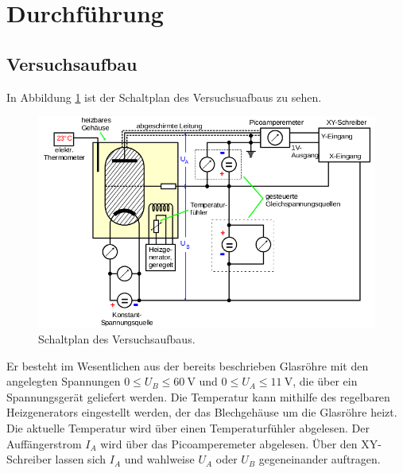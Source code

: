 \section{Durchführung}
\subsection{Versuchsaufbau}
In Abbildung \ref{fig:4} ist der Schaltplan des Versuchsuafbaus zu sehen.
\begin{figure}
  \centering
  \includegraphics[scale=0.5]{aufbau.png}
  \caption{Schaltplan des Versuchsaufbaus. \cite{anleitung}}
  \label{fig:4}
\end{figure}
Er besteht im Wesentlichen aus der bereits beschrieben Glasröhre mit den angelegten
Spannungen $0 \leq U_B \leq \SI{60}{\volt}$ und $0 \leq U_A \leq \SI{11}{\volt}$, die
über ein Spannungsgerät geliefert werden.
Die Temperatur kann mithilfe des regelbaren Heizgenerators eingestellt werden,
der das Blechgehäuse um die Glasröhre heizt.
Die aktuelle
Temperatur wird über einen Temperaturfühler abgelesen. Der Auffängerstrom $I_A$ wird über das
Picoamperemeter abgelesen. Über den XY-Schreiber lassen sich $I_A$ und wahlweise $U_A$ oder
$U_B$ gegeneinander auftragen.

